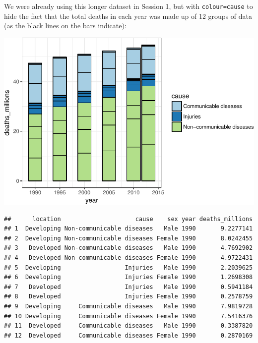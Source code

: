 \documentclass[12pt,]{krantz}
\makeatletter
\newenvironment{Shaded}{\begin{snugshade}}{\end{snugshade}}
\newcommand{\DataTypeTok}[1]{\textcolor[rgb]{0.13,0.29,0.53}{#1}}
\newcommand{\DecValTok}[1]{\textcolor[rgb]{0.00,0.00,0.81}{#1}}
\newcommand{\KeywordTok}[1]{\textcolor[rgb]{0.13,0.29,0.53}{\textbf{#1}}}
\newcommand{\NormalTok}[1]{#1}
\newcommand{\OperatorTok}[1]{\textcolor[rgb]{0.81,0.36,0.00}{\textbf{#1}}}
\newcommand{\StringTok}[1]{\textcolor[rgb]{0.31,0.60,0.02}{#1}}
\newenvironment{kframe}{%
\medskip{}
\setlength{\fboxsep}{.8em}
 \def\at@end@of@kframe{}%
 \ifinner\ifhmode%
  \def\at@end@of@kframe{\end{minipage}}%
  \begin{minipage}{\columnwidth}%
 \fi\fi%
 \def\FrameCommand##1{\hskip\@totalleftmargin \hskip-\fboxsep
 \colorbox{shadecolor}{##1}\hskip-\fboxsep
     \hskip-\linewidth \hskip-\@totalleftmargin \hskip\columnwidth}%
 \MakeFramed {\advance\hsize-\width
   \@totalleftmargin\z@ \linewidth\hsize
   \@setminipage}}%
 {\par\unskip\endMakeFramed%
 \at@end@of@kframe}
\renewenvironment{Shaded}{\begin{kframe}}{\end{kframe}}
\theoremstyle{definition}
\theoremstyle{definition}
\theoremstyle{definition}
\theoremstyle{remark}
\makeatother
\begin{document}
We were already using this longer dataset in Session 1, but with
\texttt{colour=cause} to hide the fact that the total deaths in each
year was made up of 12 groups of data (as the black lines on the bars
indicate):

\begin{Shaded}
\end{Shaded}

\includegraphics{03_summarising_files/figure-latex/unnamed-chunk-2-1.pdf}

\begin{Shaded}
\end{Shaded}

\begin{verbatim}
##      location                     cause    sex year deaths_millions
## 1  Developing Non-communicable diseases   Male 1990       9.2277141
## 2  Developing Non-communicable diseases Female 1990       8.0242455
## 3   Developed Non-communicable diseases   Male 1990       4.7692902
## 4   Developed Non-communicable diseases Female 1990       4.9722431
## 5  Developing                  Injuries   Male 1990       2.2039625
## 6  Developing                  Injuries Female 1990       1.2698308
## 7   Developed                  Injuries   Male 1990       0.5941184
## 8   Developed                  Injuries Female 1990       0.2578759
## 9  Developing     Communicable diseases   Male 1990       7.9819728
## 10 Developing     Communicable diseases Female 1990       7.5416376
## 11  Developed     Communicable diseases   Male 1990       0.3387820
## 12  Developed     Communicable diseases Female 1990       0.2870169
\end{verbatim}
\end{document}
